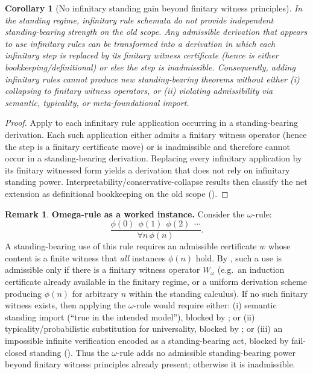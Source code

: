 \documentclass[11pt]{article}
\newtheorem{corollary}[theorem]{Corollary}
\theoremstyle{definition}
\newtheorem{remark}[theorem]{Remark}
\begin{document}
\begin{corollary}[No infinitary standing gain beyond finitary witness principles]
\label{cor:no-infinitary-gain}
In the standing regime, infinitary rule schemata do not provide independent standing-bearing
strength on the old scope.
Any admissible derivation that appears to use infinitary rules can be transformed into a derivation
in which each infinitary step is replaced by its finitary witness certificate (hence is either
bookkeeping/definitional) or else the step is inadmissible.
Consequently, adding infinitary rules cannot produce new standing-bearing theorems without
either (i) collapsing to finitary witness operators, or (ii) violating admissibility via semantic,
typicality, or meta-foundational import.
\end{corollary}

\begin{proof}
Apply  to each infinitary rule application occurring in a
standing-bearing derivation.
Each such application either admits a finitary witness operator (hence the step is a finitary
certificate move) or is inadmissible and therefore cannot occur in a standing-bearing derivation.
Replacing every infinitary application by its finitary witnessed form yields a derivation that does
not rely on infinitary standing power.
Interpretability/conservative-collapse results then classify the net extension as definitional
bookkeeping on the old scope ().
\end{proof}

\begin{remark}
\label{rem:omega-rule}
\textbf{Omega-rule as a worked instance.} Consider the $\omega$-rule:
\[
\frac{\phi(0)\ \ \phi(1)\ \ \phi(2)\ \ \cdots}{\forall n\,\phi(n)}.
\]
A standing-bearing use of this rule requires an admissible certificate $w$ whose content is a
finite witness that \emph{all} instances $\phi(n)$ hold.
By , such a use is admissible only if there is a finitary witness
operator $W_\omega$ (e.g.\ an induction certificate already available in the finitary regime, or a
uniform derivation scheme producing $\phi(n)$ for arbitrary $n$ within the standing calculus).
If no such finitary witness exists, then applying the $\omega$-rule would require either:
(i) semantic standing import (``true in the intended model''), blocked by
; or
(ii) typicality/probabilistic substitution for universality, blocked by ; or
(iii) an impossible infinite verification encoded as a standing-bearing act, blocked by fail-closed
standing ().
Thus the $\omega$-rule adds no admissible standing-bearing power beyond finitary witness
principles already present; otherwise it is inadmissible.
\end{remark}
\end{document}

